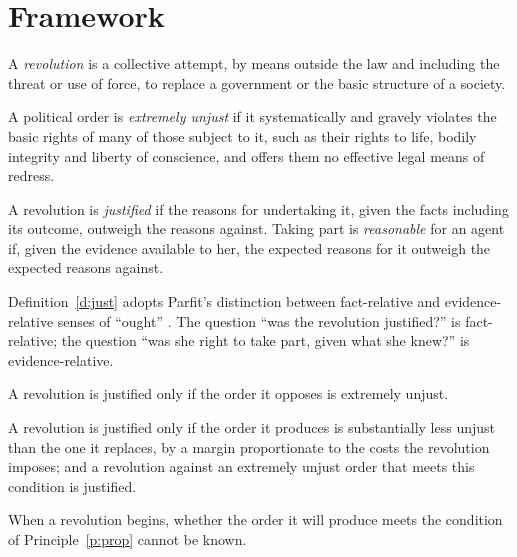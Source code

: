 \documentclass{situationist-preprint}
\begin{document}
\section{Framework}

\begin{definition}[Revolution]\label{d:revolution}
A \emph{revolution} is a collective attempt, by means outside the law and including the threat or use of force, to replace a government or the basic structure of a society.
\end{definition}

\begin{definition}\label{d:extreme}
A political order is \emph{extremely unjust} if it systematically and gravely violates the basic rights of many of those subject to it, such as their rights to life, bodily integrity and liberty of conscience, and offers them no effective legal means of redress.
\end{definition}

\begin{definition}[Justification]\label{d:just}
A revolution is \emph{justified} if the reasons for undertaking it, given the facts including its outcome, outweigh the reasons against. Taking part is \emph{reasonable} for an agent if, given the evidence available to her, the expected reasons for it outweigh the expected reasons against.
\end{definition}

Definition~\ref{d:just} adopts Parfit's distinction between fact-relative and evidence-relative senses of \enquote{ought} \citep[ch.~7]{Parfit2011}. The question \enquote{was the revolution justified?} is fact-relative; the question \enquote{was she right to take part, given what she knew?} is evidence-relative.

\begin{principle}\label{p:cause}
A revolution is justified only if the order it opposes is extremely unjust.
\end{principle}

\begin{principle}\label{p:prop}
A revolution is justified only if the order it produces is substantially less unjust than the one it replaces, by a margin proportionate to the costs the revolution imposes; and a revolution against an extremely unjust order that meets this condition is justified.
\end{principle}

\begin{assumption}[Uncertainty]\label{a:uncertain}
When a revolution begins, whether the order it will produce meets the condition of Principle~\ref{p:prop} cannot be known.
\end{assumption}
\end{document}
